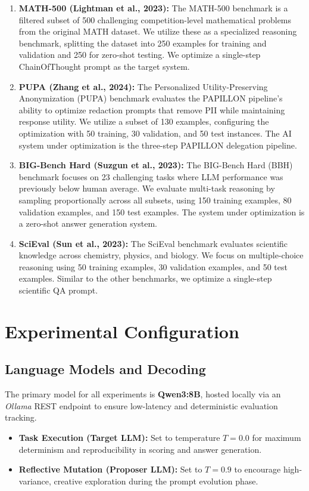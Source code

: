 \begin{enumerate}
    \item \textbf{MATH-500 (Lightman et al., 2023):} The MATH-500 benchmark is a filtered subset of 500 challenging competition-level mathematical problems from the original MATH dataset. We utilize these as a specialized reasoning benchmark, splitting the dataset into 250 examples for training and validation and 250 for zero-shot testing. We optimize a single-step ChainOfThought prompt as the target system.

    \item \textbf{PUPA (Zhang et al., 2024):} The Personalized Utility-Preserving Anonymization (PUPA) benchmark evaluates the PAPILLON pipeline's ability to optimize redaction prompts that remove PII while maintaining response utility. We utilize a subset of 130 examples, configuring the optimization with 50 training, 30 validation, and 50 test instances. The AI system under optimization is the three-step PAPILLON delegation pipeline.

    \item \textbf{BIG-Bench Hard (Suzgun et al., 2023):} The BIG-Bench Hard (BBH) benchmark focuses on 23 challenging tasks where LLM performance was previously below human average. We evaluate multi-task reasoning by sampling proportionally across all subsets, using 150 training examples, 80 validation examples, and 150 test examples. The system under optimization is a zero-shot answer generation system.

    \item \textbf{SciEval (Sun et al., 2023):} The SciEval benchmark evaluates scientific knowledge across chemistry, physics, and biology. We focus on multiple-choice reasoning using 50 training examples, 30 validation examples, and 50 test examples. Similar to the other benchmarks, we optimize a single-step scientific QA prompt.
\end{enumerate}

\section{Experimental Configuration}

\subsection{Language Models and Decoding}
The primary model for all experiments is \textbf{Qwen3:8B}, hosted locally via an \textit{Ollama} REST endpoint to ensure low-latency and deterministic evaluation tracking. 
\begin{itemize}
    \item \textbf{Task Execution (Target LLM):} Set to temperature $T=0.0$ for maximum determinism and reproducibility in scoring and answer generation.
    \item \textbf{Reflective Mutation (Proposer LLM):} Set to $T=0.9$ to encourage high-variance, creative exploration during the prompt evolution phase.
\end{itemize}

